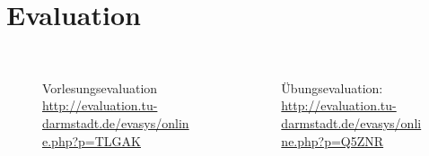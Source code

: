 \section{Evaluation}
\begin{frame}
    \slidehead
    \begin{columns}
        \begin{column}{6cm}
            \vspace{-0.5cm}
            \begin{figure}
                \centering
                \\  \sffamily \tiny Vorlesungsevaluation \href{http://evaluation.tu-darmstadt.de/evasys/online.php?p=TLGAK}{http://evaluation.tu-darmstadt.de/evasys/online.php?p=TLGAK}
            \end{figure}
        \end{column}
        \begin{column}{6cm}
            \vspace{-0.5cm}
            \begin{figure}
                \centering
                \\  \sffamily \tiny Übungsevaluation: \href{http://evaluation.tu-darmstadt.de/evasys/online.php?p=Q5ZNR}{http://evaluation.tu-darmstadt.de/evasys/online.php?p=Q5ZNR}
            \end{figure}
        \end{column}
    \end{columns}
\end{frame}




